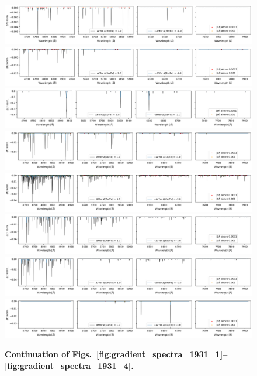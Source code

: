 \documentclass[
  journal=pasa,
  manuscript=research-paper, %
  year=2021,
  volume=37,
]{cup-journal}
\begin{document}
\begin{figure}[hbt!]
 \centering  
 \includegraphics[width=\textwidth]{figures/gradient_spectrum_1931_mo_fe.png}
 \includegraphics[width=\textwidth]{figures/gradient_spectrum_1931_ru_fe.png}
 \includegraphics[width=\textwidth]{figures/gradient_spectrum_1931_ba_fe.png}
 \includegraphics[width=\textwidth]{figures/gradient_spectrum_1931_la_fe.png}
 \includegraphics[width=\textwidth]{figures/gradient_spectrum_1931_ce_fe.png}
 \includegraphics[width=\textwidth]{figures/gradient_spectrum_1931_nd_fe.png}
 \includegraphics[width=\textwidth]{figures/gradient_spectrum_1931_sm_fe.png}
 \includegraphics[width=\textwidth]{figures/gradient_spectrum_1931_eu_fe.png}
 \caption{\textbf{Continuation of Figs.~\ref{fig:gradient_spectra_1931_1}--\ref{fig:gradient_spectra_1931_4}.}} \label{fig:gradient_spectra_1931_5}
\end{figure}
\end{document}
